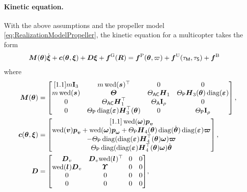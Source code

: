 \paragraph{Kinetic equation.}
With the above assumptions and the propeller model \eqref{eq:RealizationModelPropeller}, the kinetic equation for a multicopter takes the form
\begin{align}\label{eq:RealizationMulticopterKinetics}
 \boldsymbol{M}(\boldsymbol{\theta_{}}) \dot{\boldsymbol{\xi}} + \boldsymbol{c}(\boldsymbol{\theta_{}}, \boldsymbol{\xi}) + \boldsymbol{D} \boldsymbol{\xi} + \boldsymbol{f}^{\mathrm{G}}(\boldsymbol{R}) &= \boldsymbol{f}^{\mathrm{P}}(\boldsymbol{\theta_{}}, \varpi_{}) + \boldsymbol{f}^{\mathrm{U}}(\tau_{\mathsf{M}}, \tau_{\mathsf{S}}) + \boldsymbol{f}^{\mathrm{B}}
\end{align}
where
\begin{subequations}\label{eq:RealizationMulticopterForces}
\allowdisplaybreaks
\begin{align}
 \sysInertiaMat(\tuple{\PropTilt}) &=
 \begin{bmatrix}[1.1]
  \m \idMat[3] & \m \wedOp(\bodyCOM{}{})^\top & 0 & 0 \\
  \m \wedOp(\bodyCOM{}{}) & \bodyMOI{}{}{} & \JAC \mat{H}_1 & \JP \mat{H}_3(\tuple{\PropTilt}) \diag(\tuple{\PropDir}) \\
  0 & \JAC \mat{H}_1^\top & \ArmInertia \idMat[\numProp] & 0 \\
  0 & \JP \diag(\tuple{\PropDir}) \mat{H}_3^\top(\tuple{\PropTilt}) & 0 & \PropInertia \idMat[\numProp]
 \end{bmatrix},
\\
 \gyroForce(\tuple{\PropTilt}, \sysVel) &= 
 \begin{bmatrix}[1.1]
  \wedOp(\w) \tuple{\genMomentumSym}_{\v} \\
  \wedOp(\v) \tuple{\genMomentumSym}_{\v} + \wedOp(\w) \tuple{\genMomentumSym}_{\w} + \JP \mat{H}_4(\tuple{\PropTilt}) \diag(\dot{\tuple{\PropTilt}}) \diag(\tuple{\PropDir}) \tuple{\PropVel} \\
  -\JP \diag( \diag(\tuple{\PropDir}) \mat{H}_4^\top(\tuple{\PropTilt}) \w) \tuple{\PropVel} \\
   \JP \diag( \diag(\tuple{\PropDir}) \mat{H}_4^\top(\tuple{\PropTilt}) \w) \dot{\tuple{\PropTilt}} \\
 \end{bmatrix},
\\
 \sysDissMat &= \begin{bmatrix} \mat{D}_v & \mat{D}_v \!\wedOp(\bodyCOD{}{})^\top\! & 0 & 0 \\ \wedOp(\bodyCOD{}{}) \mat{D}_v & \bodyMOD{}{}{} & 0 & 0 \\ 0 & 0 & 0 & 0 \\ 0 & 0 & 0 & 0 \end{bmatrix}\!,

\end{align}
\end{subequations}
